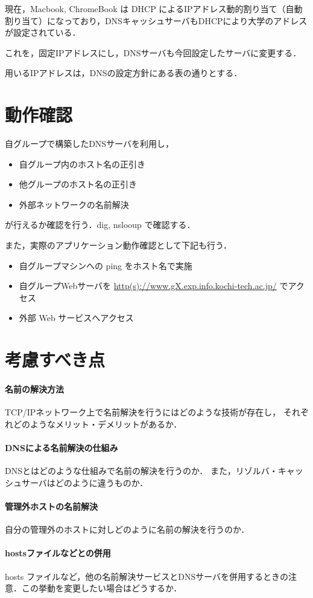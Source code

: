 現在，Macbook, ChromeBook は DHCP によるIPアドレス動的割り当て（自動割り当て）になっており，DNSキャッシュサーバもDHCPにより大学のアドレスが設定されている．

これを，固定IPアドレスにし，DNSサーバも今回設定したサーバに変更する．

用いるIPアドレスは，DNSの設定方針にある表の通りとする．


\section{動作確認}
 自グループで構築したDNSサーバを利用し，
 \begin{itemize}
     \item 自グループ内のホスト名の正引き
     \item 他グループのホスト名の正引き
     \item 外部ネットワークの名前解決
 \end{itemize}
 が行えるか確認を行う．dig, nslooup で確認する．

また，実際のアプリケーション動作確認として下記も行う．
 \begin{itemize}
     \item 自グループマシンへの ping をホスト名で実施
     \item 自グループWebサーバを \url{http(s)://www.gX.exp.info.kochi-tech.ac.jp/} でアクセス
     \item 外部 Web サービスへアクセス
 \end{itemize}

 
\section{考慮すべき点}
\paragraph{名前の解決方法}
			TCP/IPネットワーク上で名前解決を行うにはどのような技術が存在し，
			それぞれどのようなメリット・デメリットがあるか．
\paragraph{DNSによる名前解決の仕組み}
		DNSとはどのような仕組みで名前の解決を行うのか．
		また，リゾルバ・キャッシュサーバはどのように違うものか．
\paragraph{管理外ホストの名前解決}
		自分の管理外のホストに対しどのように名前の解決を行うのか．
\paragraph{hostsファイルなどとの併用}
	hosts ファイルなど，他の名前解決サービスとDNSサーバを併用するときの注意．この挙動を変更したい場合はどうするか．
 
